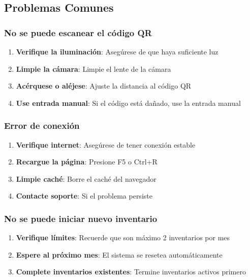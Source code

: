 \documentclass[11pt,a4paper]{article}
\begin{document}
\subsection{Problemas Comunes}

\subsubsection{No se puede escanear el código QR}

\begin{enumerate}
    \item \textbf{Verifique la iluminación}: Asegúrese de que haya suficiente luz
    \item \textbf{Limpie la cámara}: Limpie el lente de la cámara
    \item \textbf{Acérquese o aléjese}: Ajuste la distancia al código QR
    \item \textbf{Use entrada manual}: Si el código está dañado, use la entrada manual
\end{enumerate}

\subsubsection{Error de conexión}

\begin{enumerate}
    \item \textbf{Verifique internet}: Asegúrese de tener conexión estable
    \item \textbf{Recargue la página}: Presione F5 o Ctrl+R
    \item \textbf{Limpie caché}: Borre el caché del navegador
    \item \textbf{Contacte soporte}: Si el problema persiste
\end{enumerate}

\subsubsection{No se puede iniciar nuevo inventario}

\begin{enumerate}
    \item \textbf{Verifique límites}: Recuerde que son máximo 2 inventarios por mes
    \item \textbf{Espere al próximo mes}: El sistema se resetea automáticamente
    \item \textbf{Complete inventarios existentes}: Termine inventarios activos primero
\end{enumerate}
\end{document}
